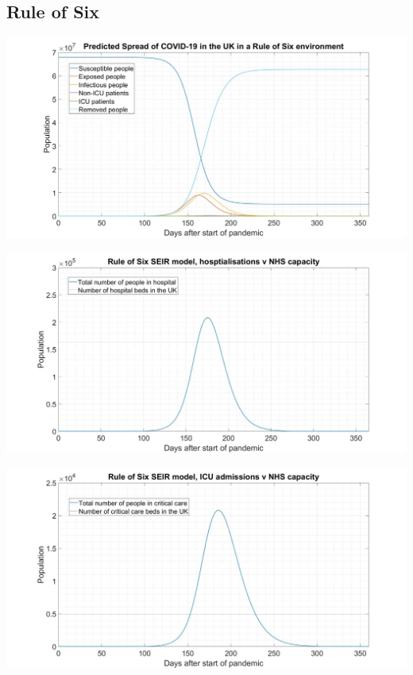 \documentclass[11pt]{article}
\begin{document}
\subsection{Rule of Six}
\begin{center}
\includegraphics[width=1\textwidth]{ROSSEIHR.jpg} 
\end{center}
\begin{center}
\includegraphics[width=1\textwidth]{ROSH.jpg} 
\end{center}
\begin{center}
\includegraphics[width=1\textwidth]{ROSHICU.jpg} 
\end{center}
\end{document}
